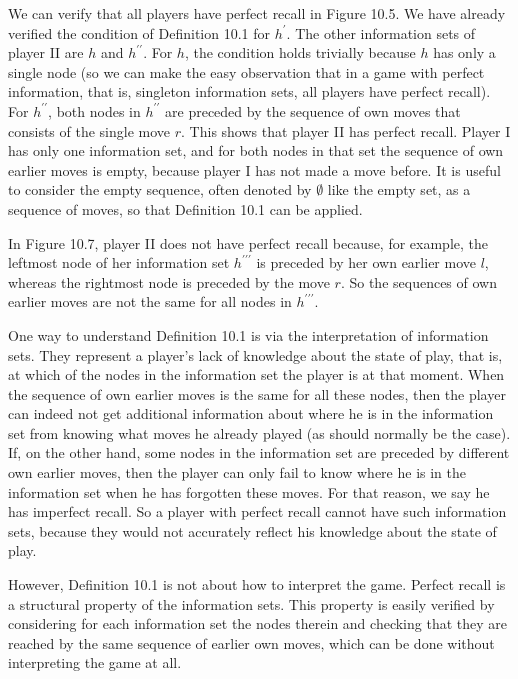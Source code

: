 \documentclass[12pt]{article}
\begin{document}
We can verify that all players have perfect recall in Figure 10.5. We have already verified the condition of Definition 10.1 for $h^{\prime}$. The other information sets of player II are $h$ and $h^{\prime \prime}$. For $h$, the condition holds trivially because $h$ has only a single node (so we can make the easy observation that in a game with perfect information, that is, singleton information sets, all players have perfect recall). For $h^{\prime \prime}$, both nodes in $h^{\prime \prime}$ are preceded by the sequence of own moves that consists of the single move $r$. This shows that player II has perfect recall. Player I has only one information set, and for both nodes in that set the sequence of own earlier moves is empty, because player I has not made a move before. It is useful to consider the empty sequence, often denoted by $\emptyset$ like the empty set, as a sequence of moves, so that Definition 10.1 can be applied.

In Figure 10.7, player II does not have perfect recall because, for example, the leftmost node of her information set $h^{\prime \prime \prime}$ is preceded by her own earlier move $l$, whereas the rightmost node is preceded by the move $r$. So the sequences of own earlier moves are not the same for all nodes in $h^{\prime \prime \prime}$.

One way to understand Definition 10.1 is via the interpretation of information sets. They represent a player's lack of knowledge about the state of play, that is, at which of the nodes in the information set the player is at that moment. When the sequence of own earlier moves is the same for all these nodes, then the player can indeed not get additional information about where he is in the information set from knowing what moves he already played (as should normally be the case). If, on the other hand, some nodes in the information set are preceded by different own earlier moves, then the player can only fail to know where he is in the information set when he has forgotten these moves. For that reason, we say he has imperfect recall. So a player with perfect recall cannot have such information sets, because they would not accurately reflect his knowledge about the state of play.

However, Definition 10.1 is not about how to interpret the game. Perfect recall is a structural property of the information sets. This property is easily verified by considering for each information set the nodes therein and checking that they are reached by the same sequence of earlier own moves, which can be done without interpreting the game at all.
\end{document}
